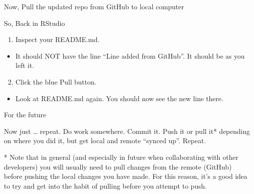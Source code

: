 \documentclass[
  ignorenonframetext,
]{beamer}
\providecommand{\tightlist}{%
  \setlength{\itemsep}{0pt}\setlength{\parskip}{0pt}}
\begin{document}
\begin{frame}{Now, Pull the updated repo from GitHub to local computer}
\protect\hypertarget{now-pull-the-updated-repo-from-github-to-local-computer}{}

So, Back in RStudio

\begin{enumerate}
\tightlist
\item
  Inspect your README.md.
\end{enumerate}

\begin{itemize}
\tightlist
\item
  It should NOT have the line ``Line added from GitHub''. It should be
  as you left it.
\end{itemize}

\begin{enumerate}
\setcounter{enumi}{1}
\tightlist
\item
  Click the blue Pull button.
\end{enumerate}

\begin{itemize}
\tightlist
\item
  Look at README.md again. You should now see the new line there.
\end{itemize}

\end{frame}

\begin{frame}{For the future}
\protect\hypertarget{for-the-future}{}

Now just \ldots{} repeat. Do work somewhere. Commit it. Push it or pull
it* depending on where you did it, but get local and remote ``synced
up''. Repeat.

* Note that in general (and especially in future when collaborating with
other developers) you will usually need to pull changes from the remote
(GitHub) before pushing the local changes you have made. For this
reason, it's a good idea to try and get into the habit of pulling before
you attempt to push.

\end{frame}
\end{document}
